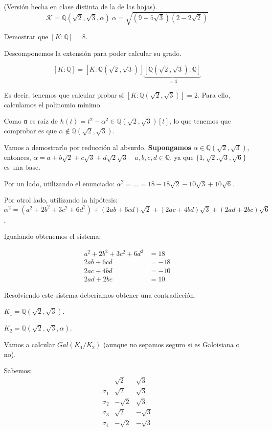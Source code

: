 \begin{problem}[5] (Versión hecha en clase distinta de la de las hojas).
$$\mathcal{K} = ℚ(\sqrt{2},\sqrt{3},α)\; α = \sqrt{(9-5\sqrt{3})(2-2\sqrt{2})}$$

Demostrar que $[K:ℚ] = 8$.
\solution

Descomponemos la extensión para poder calcular su grado.

$$[K:ℚ] = [K: ℚ(\sqrt{2},\sqrt{3})]\underbrace{[ℚ(\sqrt{2},\sqrt{3}):ℚ]}_{=4}$$

Es decir, tenemos que calcular probar si $[K: ℚ(\sqrt{2},\sqrt{3})]= 2$. Para ello, calculamos el polinomio mínimo.

Como α es raíz de $h(t) = t^2-α^2 ∈ℚ(\sqrt{2},\sqrt{3})[t]$, lo que tenemos que comprobar es que $α∉ℚ(\sqrt{2},\sqrt{3})$.

Vamos a demostrarlo por reducción al absurdo. \textbf{Supongamos} $α∈ℚ(\sqrt{2},\sqrt{3})$, entonces, $α = a+b\sqrt{2} + c \sqrt{3} + d\sqrt{2}\sqrt{3}\quad a,b,c,d∈ℚ$, ya que $\{1,\sqrt{2}.\sqrt{3},\sqrt{6}\}$ es una base.

Por un lado, utilizando el enunciado: $α^2 =  ... = 18-18\sqrt{2} - 10\sqrt{3} + 10\sqrt{6}$.

Por otrol lado, utilizando la hipótesis:
$α^2 =(a^2+2b^2 + 3c^2 + 6d^2) + (2ab + 6cd) \sqrt{2} + (2ac + 4bd)\sqrt{3}+(2ad + 2bc) \sqrt{6}$.

Igualando obtenemos el sistema:

\[
\begin{array}{cc}
a^2+2b^2 + 3c^2 + 6d^2 &= 18\\2ab + 6cd &= -18 \\ 2ac + 4bd &= -10\\ 2ad + 2bc &= 10
\end{array}
\]

Resolviendo este sistema deberíamos obtener una contradicción.


\ppart

$K_1 = ℚ(\sqrt{2},\sqrt{3})$.

$K_2 = ℚ(\sqrt{2},\sqrt{3},α)$.


Vamos a calcular $Gal(K_1/K_2)$ (aunque no sepamos seguro si es Galoisiana o no).

Sabemos: $$\begin{array}{c|c|c}
&\sqrt{2}&\sqrt{3}\\\hline
σ_1 & \sqrt{2} & \sqrt{3}\\
σ_2 & - \sqrt{2} & \sqrt{3}\\
σ_3 & \sqrt{2} & -\sqrt{3}\\
σ_4 & - \sqrt{2} & -\sqrt{3}\end{array}
$$


\end{problem}
